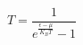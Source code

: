 \documentclass{article}
\begin{document}
$$ T=\frac{1}{e^{\frac{\epsilon - \mu}{K_B T}}-1} $$
\end{document}
